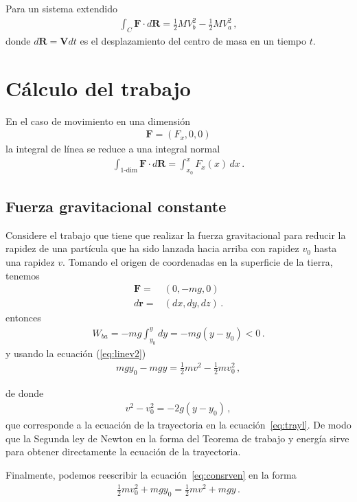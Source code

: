 Para un sistema extendido
\begin{align}
  \int_C \mathbf{F}\cdot d\mathbf{R}=\tfrac{1}{2}M V_b^2-\tfrac{1}{2}M V_a^2\,,
\end{align}
donde $d\mathbf{R}=\mathbf{V}dt$ es el desplazamiento del centro de masa en un tiempo $t$.


\section{Cálculo del trabajo}
En el caso de movimiento en una dimensión
\begin{align*}
  \mathbf{F}=(F_x,0,0)
\end{align*}
la integral de línea se reduce a una integral normal
\begin{align*}
  \int_{\text{1-dim}}\mathbf{F}\cdot d\mathbf{R}=\int_{x_0}^{x}F_x(x)\,dx\,.
\end{align*}


\subsection{Fuerza gravitacional constante}
\begin{frame}
Considere el trabajo que tiene que realizar la fuerza gravitacional
para reducir la rapidez de una partícula que ha sido lanzada hacia
arriba con rapidez $v_0$ hasta una rapidez $v$. Tomando el origen de coordenadas en la superficie de la tierra, tenemos
\begin{align*}
  \mathbf{F}=&(0,-mg,0)\nonumber\\
  d\mathbf{r}=&(dx,dy,dz)\,.
\end{align*}
entonces
\begin{align*}
  W_{ba}=-mg\int_{y_0}^ydy=-mg(y-y_0)<0\,.
\end{align*}
y usando la ecuación (\ref{eq:linev2})
\begin{align}
  \label{eq:consrven}
  mgy_0-mgy=\tfrac{1}{2}m v^2-\tfrac{1}{2}m v_0^2\,,
\end{align}
\end{frame}
de donde
\begin{align*}
  v^2-v_0^2=-2g(y-y_0)\,,
\end{align*}
que corresponde a la ecuación de la trayectoria en la
ecuación~\eqref{eq:trayl}. De modo que la Segunda ley de Newton en la
forma del Teorema de trabajo y energía sirve para obtener directamente
la ecuación de la trayectoria.

Finalmente, podemos reescribir la ecuación~\eqref{eq:consrven} en la
forma
\begin{align}
  \tfrac{1}{2}m v_0^2+mgy_0=\tfrac{1}{2}m v^2+mgy\,.
\end{align}

